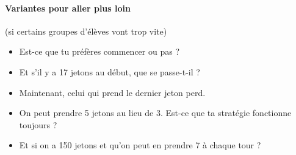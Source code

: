 \documentclass[12pt, a4paper]{article}
\begin{document}
\paragraph*{Variantes pour aller plus loin} (si certains groupes d'élèves vont trop vite)
\begin{itemize}
\item Est-ce que tu préfères commencer ou pas ?
\item Et s'il y a 17 jetons au début, que se passe-t-il ?
\item Maintenant, celui qui prend le dernier jeton perd.
\item On peut prendre 5 jetons au lieu de 3. Est-ce que ta stratégie fonctionne toujours ?
\item Et si on a 150 jetons et qu'on peut en prendre 7 à chaque tour ?
\end{itemize}
\end{document}
